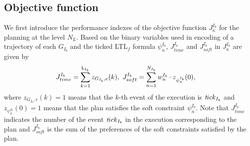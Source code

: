 \documentclass{article}
\newcommand{\ttick}{{\textit tick}}
\newcommand{\Len}{{\sf L}}
\newcommand{\M}{\mathcal{M}}
\newcommand{\W}{\mathcal{W}}
\begin{document}
\subsection{Objective function}
%
We first introduce the performance indexes of the objective function $J_\kappa^{I_b}$ for the planning at the level $N_L$. 
Based on the binary variables used in encoding of a trajectory of each $G_{I_b}$ and the ticked LTL${}_f$ formula $\psi^{I_b}_n$, $J_{time}^{I_b}$ and $J_{soft}^{I_b}$ in $J_{\kappa}^{I_b}$ are given by
\begin{align}\label{obj:1}
J_{time}^{I_b}=\sum_{k=1}^{\Len_{I_b}}z_{G_{I_b},e}(k),~ J_{soft}^{I_b}=\sum_{n=1}^{N_{I_b}} w_{n}^{I_b}\cdot z_{\psi_{n}^{I_b}}(0), 
\end{align}
where $z_{G_{I_b},e}(k)=1$ means that the $k$-th event of the execution is $\ttick_{I_b}$ and $z_{\psi_{n}^{I_b}}(0)=1$ means that the plan satisfies the soft constraint $\psi_{n}^{I_b}$.
Note that $J_{time}^{I_b}$ indicates the number of the event $\ttick_{I_b}$ in the execution corresponding to the plan and $J_{soft}^{I_b}$ is the sum of the preferences of the soft constraints satisfied by the plan. 
%
\end{document}

